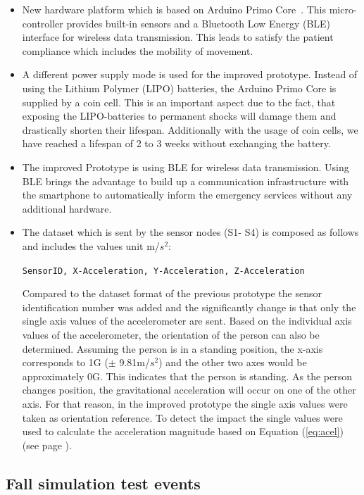 \documentclass[conference]{IEEEtran}
\theoremstyle{definition}
\begin{document}
\begin{itemize}
 \item New hardware platform which is based on Arduino Primo Core~\cite{Arduino2018}. 
 This micro-controller provides built-in sensors and a Bluetooth Low Energy (BLE) 
 interface for wireless data transmission. This leads to satisfy the patient compliance
 which includes the mobility of movement.
 \item A different power supply mode is used for the improved prototype. Instead of 
 using the Lithium Polymer (LIPO) batteries, the Arduino Primo Core is supplied by a 
 coin cell. This is an important aspect due to the fact, that exposing the LIPO-batteries 
 to permanent shocks will damage them and drastically shorten their lifespan. 
 Additionally with the usage of coin cells, we have reached a lifespan of 2 to 3 weeks 
 without exchanging the battery.
 \item The improved Prototype is using BLE for wireless data transmission. Using BLE 
 brings the advantage to build up a communication infrastructure with the smartphone 
 to automatically inform the emergency services without any additional hardware.
 \item The dataset which is sent by the sensor nodes (S1- S4) is composed as follows 
 and includes the values unit m/$s^2$:
 \begin{center}
  \texttt{SensorID, X-Acceleration, Y-Acceleration, Z-Acceleration}
 \end{center}
 Compared to the dataset format of the previous prototype the sensor identification 
 number was added and the significantly change is that only the single axis values of 
 the accelerometer are sent. Based on the individual axis values of the accelerometer, 
 the orientation of the person can also be determined. Assuming the person is in a standing 
 position, the x-axis corresponds to 1G ($\pm$ 9.81m/$s^2$) and the other two axes would be 
 approximately 0G. This indicates that the person is standing. As the person changes 
 position, the gravitational acceleration will occur on one of the other axis. For that 
 reason, in the improved prototype the single axis values were taken as orientation 
 reference. To detect the impact the single values were used to calculate the acceleration 
 magnitude based on Equation (\ref{eq:acel}) (see page \pageref{eq:acel}).
\end{itemize}

\subsection{Fall simulation test events} %
\end{document}
